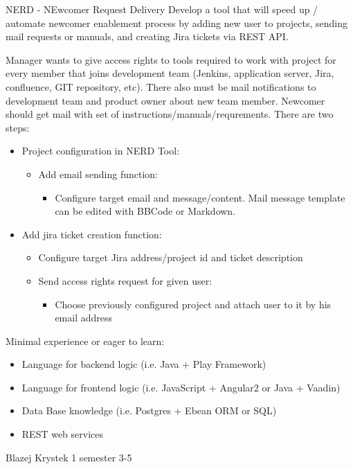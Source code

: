 \begin{project}
{NERD - NEwcomer Request Delivery}
{Develop a tool that will speed up / automate newcomer enablement process by adding new user to projects, sending mail requests or manuals, and creating Jira tickets via REST API.} 
{
Manager wants to give access rights to tools required to work with project for every member that joins development team (Jenkins, application server, Jira, confluence, GIT repository, etc). There also must be mail notifications to development team and product owner about new team member. Newcomer should get mail with set of instructions/manuals/requrements.
\bigbreak
There are two steps:
\begin{itemize}
	\item Project configuration in NERD Tool:
		\begin{itemize}
			\item Add email sending function:
				\begin{itemize}
					\item Configure target email and message/content. Mail message template can be edited with BBCode or Markdown.
				\end{itemize}
		\end{itemize}
	\item Add jira ticket creation function:
		\begin{itemize}
			\item Configure target Jira address/project id and ticket description
			\item Send access rights request for given user:
				\begin{itemize}
					\item Choose previously configured project and attach user to it by his email address
				\end{itemize}
		\end{itemize}
\end{itemize}
}
{
Minimal experience or eager to learn:
\begin{itemize}
	\item Language for backend logic (i.e. Java + Play Framework)
	\item Language for frontend logic (i.e. JavaScript + Angular2 or Java + Vaadin)
	\item Data Base knowledge (i.e. Postgres + Ebean ORM or SQL)
	\item REST web services
\end{itemize}
}
{Blazej Krystek}
{1 semester}
{3-5}
\end{project}
